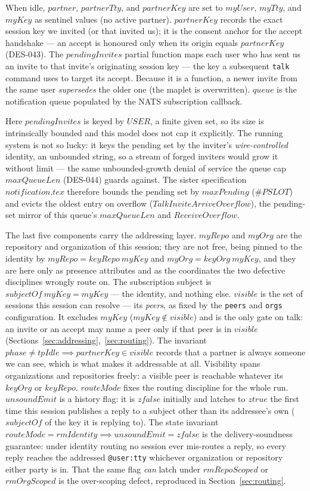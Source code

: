\documentclass[a4paper,10pt,fleqn]{article}
\begin{document}
When idle, $partner$, $partnerTty$, and $partnerKey$ are set to
$myUser$, $myTty$, and $myKey$ as sentinel values (no active partner).
$partnerKey$ records the exact session key we invited (or that invited
us); it is the consent anchor for the accept handshake --- an accept is
honoured only when its origin equals $partnerKey$ (DES-043).  The
$pendingInvites$ partial function maps each user who has sent us an
invite to that invite's originating session key --- the key a
subsequent \texttt{talk} command uses to target its accept.  Because
it is a function, a newer invite from the same user \emph{supersedes}
the older one (the maplet is overwritten).  $queue$ is the
notification queue populated by the NATS subscription callback.

Here $pendingInvites$ is keyed by $USER$, a finite given set, so its
size is intrinsically bounded and this model does not cap it
explicitly.  The running system is not so lucky: it keys the pending
set by the inviter's \emph{wire-controlled} identity, an unbounded
string, so a stream of forged inviters would grow it without limit ---
the same unbounded-growth denial of service the queue cap $maxQueueLen$
(DES-044) guards against.  The sister specification $notification.tex$
therefore bounds the pending set by $maxPending$ ($\# PSLOT$) and evicts
the oldest entry on overflow ($TalkInviteArriveOverflow$), the
pending-set mirror of this queue's $maxQueueLen$ and $ReceiveOverflow$.

The last five components carry the addressing layer.  $myRepo$ and
$myOrg$ are the repository and organization of this session; they are
not free, being pinned to the identity by $myRepo = keyRepo~myKey$ and
$myOrg = keyOrg~myKey$, and they are here only as presence attributes and
as the coordinates the two defective disciplines wrongly route on.  The
subscription subject is $subjectOf~myKey = myKey$ --- the identity, and
nothing else.  $visible$ is the set of sessions this session can resolve
--- its \emph{peers}, as fixed by the \texttt{peers} and \texttt{orgs}
configuration.  It excludes $myKey$ ($myKey \notin visible$) and is the
only gate on talk: an invite or an accept may name a peer only if that
peer is in $visible$ (Sections~\ref{sec:addressing},~\ref{sec:routing}).
The invariant $phase \neq tpIdle \implies partnerKey \in visible$ records
that a partner is always someone we can see, which is what makes it
addressable at all.  Visibility spans organizations and repositories
freely: a visible peer is reachable whatever its $keyOrg$ or $keyRepo$.
$routeMode$ fixes the routing discipline for the whole run.  $unsoundEmit$
is a history flag: it is $zfalse$ initially and latches to $ztrue$ the
first time this session publishes a reply to a subject other than its
addressee's own ($subjectOf$ of the key it is replying to).  The state
invariant $routeMode = rmIdentity \implies unsoundEmit = zfalse$ is the
delivery-soundness guarantee: under identity routing no session ever
mis-routes a reply, so every reply reaches the addressed
\texttt{@user:tty} whichever organization or repository either party is
in.  That the same flag \emph{can} latch under $rmRepoScoped$ or
$rmOrgScoped$ is the over-scoping defect, reproduced in
Section~\ref{sec:routing}.
\end{document}
